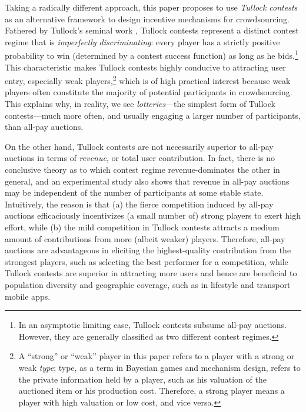 \documentclass{sig-alternate-10pt}
\begin{document}
Taking a radically different approach, this paper proposes to use {\em Tullock contests} as an alternative framework to design incentive mechanisms for crowdsourcing. Fathered by Tullock's seminal work \cite{Tullock80}, Tullock contests represent a distinct contest regime that is {\em imperfectly discriminating}: every player has a strictly positive probability to win (determined by a contest success function) as long as he bids.\footnote{In an asymptotic limiting case, Tullock contests subsume all-pay auctions. However, they are generally classified as two different contest regimes.} This characteristic makes Tullock contests highly conducive to attracting user entry, especially weak players\cite{Franke14},\footnote{A ``strong'' or ``weak'' player in this paper refers to a player with a strong or weak {\em type}; type, as a term in Bayesian games and mechanism design, refers to the private information held by a player, such as his valuation of the auctioned item or his production cost. Therefore, a strong player means a player with high valuation or low cost, and vice versa.} which is of high practical interest because weak players often constitute the majority of potential participants in crowdsourcing. This explains why, in reality, we see {\em lotteries}---the simplest form of Tullock contests---much more often, and usually engaging a larger number of participants, than all-pay auctions.

On the other hand, Tullock contests are not necessarily superior to all-pay auctions in terms of {\em revenue}, or total user contribution. In fact, there is no conclusive theory as to which contest regime revenue-dominates the other in general\cite{allpay-lot-wp13,Fang02lot,Franke14}, and an experimental study also shows that revenue in all-pay auctions may be independent of the number of participants at some stable state\cite{allpay06exp}. Intuitively, the reason is that (a) the fierce competition induced by all-pay auctions efficaciously incentivizes (a small number of) strong players to exert high effort, while (b) the mild competition in Tullock contests attracts a medium amount of contributions from more (albeit weaker) players. Therefore, all-pay auctions are advantageous in eliciting the highest-quality contribution from the strongest players, such as selecting the best performer for a competition, while Tullock contests are superior in attracting more users and hence are beneficial to population diversity and geographic coverage, such as in lifestyle\cite{livecomp09} and transport mobile apps\cite{greengps10mobisys,lau11ucc}.
\end{document}
